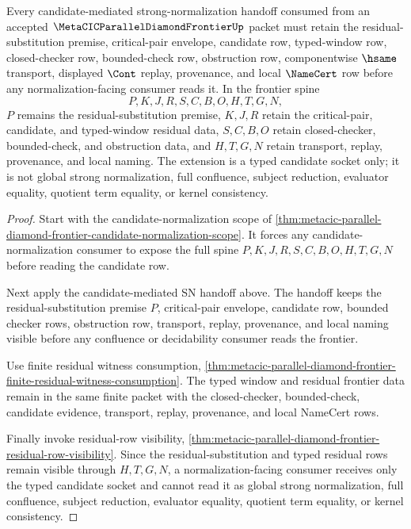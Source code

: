 \begin{theorem}
\label{thm:metacic-parallel-diamond-frontier-typed-candidate-sn-extension}
Every candidate-mediated strong-normalization handoff consumed from an accepted $\MetaCICParallelDiamondFrontierUp$ packet must retain the residual-substitution premise, critical-pair envelope, candidate row, typed-window row, closed-checker row, bounded-check row, obstruction row, componentwise $\hsame$ transport, displayed $\Cont$ replay, provenance, and local $\NameCert$ row before any normalization-facing consumer reads it. In the frontier spine
$$
P,K,J,R,S,C,B,O,H,T,G,N ,
$$
$P$ remains the residual-substitution premise, $K,J,R$ retain the critical-pair, candidate, and typed-window residual data, $S,C,B,O$ retain closed-checker, bounded-check, and obstruction data, and $H,T,G,N$ retain transport, replay, provenance, and local naming. The extension is a typed candidate socket only; it is not global strong normalization, full confluence, subject reduction, evaluator equality, quotient term equality, or kernel consistency.
\end{theorem}
\begin{proof}
Start with the candidate-normalization scope of \autoref{thm:metacic-parallel-diamond-frontier-candidate-normalization-scope}. It forces any candidate-normalization consumer to expose the full spine $P,K,J,R,S,C,B,O,H,T,G,N$ before reading the candidate row.

Next apply the candidate-mediated SN handoff above. The handoff keeps the residual-substitution premise $P$, critical-pair envelope, candidate row, bounded checker rows, obstruction row, transport, replay, provenance, and local naming visible before any confluence or decidability consumer reads the frontier.

Use finite residual witness consumption, \autoref{thm:metacic-parallel-diamond-frontier-finite-residual-witness-consumption}. The typed window and residual frontier data remain in the same finite packet with the closed-checker, bounded-check, candidate evidence, transport, replay, provenance, and local NameCert rows.

Finally invoke residual-row visibility, \autoref{thm:metacic-parallel-diamond-frontier-residual-row-visibility}. Since the residual-substitution and typed residual rows remain visible through $H,T,G,N$, a normalization-facing consumer receives only the typed candidate socket and cannot read it as global strong normalization, full confluence, subject reduction, evaluator equality, quotient term equality, or kernel consistency.
\end{proof}

